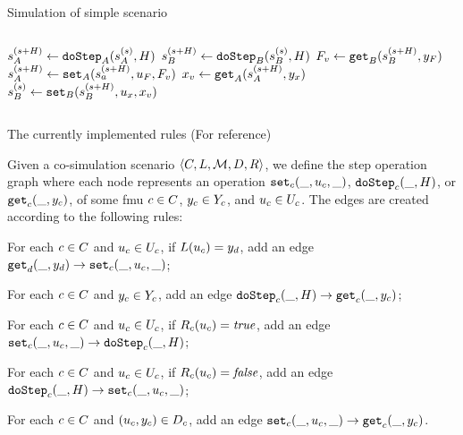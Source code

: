 \documentclass{beamer}
\begin{document}
\begin{frame}{Simulation of simple scenario}
\begin{columns}[T]
    \hfill%
    \begin{column}{.48\textwidth}
        \begin{algorithm}[H]
            \caption{Step function of scenario}
            \begin{algorithmic}[1]
              \scriptsize
              \State $s_{A}^{(s+H)} \gets \mathtt{doStep}_{A}(s_{A}^{(s)}, H)$
              \State $s_{B}^{(s+H)} \gets \mathtt{doStep}_{B}(s_{B}^{(s)}, H)$
              \State $F_v \gets \mathtt{get}_{B}(s_{B}^{(s+H)}, y_{F})$
              \State $s_{A}^{(s+H)} \gets \mathtt{set}_{A}(s_{a}^{(s+H)}, u_{F}, F_v)$
              \State $x_v \gets \mathtt{get}_{A}(s_{A}^{(s+H)}, y_{x})$
              \State $s_{B}^{(s)} \gets \mathtt{set}_{B}(s_{B}^{(s+H)}, u_{x}, x_v)$
            \end{algorithmic}
          \end{algorithm}
    \end{column}%
    \end{columns}
\end{frame}

\begin{frame}{The currently implemented rules (For reference)}
    \begin{definition}\label{def:operation_graph}
        Given a co-simulation scenario $ \left\langle C, L, \mathcal{M}, D, R \right\rangle $, we define the step operation graph where each node represents an operation $\mathtt{set}_{c}(\_, u_{c}, \_)$, $\mathtt{doStep}_{c}(\_, H)$, or $\mathtt{get}_{c}(\_, y_{c})$, of some fmu $c \in C$, $y_{c} \in Y_{c}$, and $u_{c} \in U_{c}$.
        The edges are created according to the following rules:
        \begin{compactenum}
          \item For each $c \in C$ and $u_{c} \in U_{c}$, if $L(u_{c}) = y_{d}$, add an edge $\mathtt{get}_{d}(\_, y_{d}) -> \mathtt{set}_{c}(\_, u_{c}, \_)$;
          \item For each $c \in C$ and $y_{c} \in Y_{c}$, add an edge $\mathtt{doStep}_{c}(\_, H) -> \mathtt{get}_{c}(\_, y_{c})$;
          \item For each $c \in C$ and $u_{c} \in U_{c}$, if $R_{c}(u_{c})=\mathit{true}$, add an edge $\mathtt{set}_{c}(\_, u_{c}, \_) -> \mathtt{doStep}_{c}(\_, H)$;
          \item For each $c \in C$ and $u_{c} \in U_{c}$, if $R_{c}(u_{c})=\mathit{false}$, add an edge $\mathtt{doStep}_{c}(\_, H) -> \mathtt{set}_{c}(\_, u_{c}, \_)$;
          \item For each $c \in C$ and $(u_{c},y_{c}) \in D_{c}$, add an edge 
          $\mathtt{set}_{c}(\_, u_{c}, \_) -> \mathtt{get}_{c}(\_, y_{c})$.
        \end{compactenum}
      \end{definition}      
\end{frame}
\end{document}
